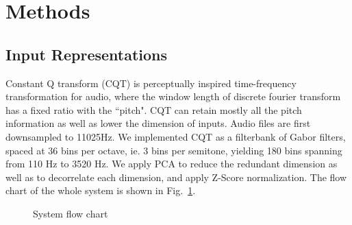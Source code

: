 \documentclass{article}
\begin{document}


\section{Methods}
\subsection{Input Representations}
Constant Q transform (CQT) is perceptually inspired time-frequency transformation for audio, where the window length of discrete fourier transform has a fixed ratio with the ``pitch". CQT can retain mostly all the pitch information as well as lower the dimension of inputs. Audio files are first downsampled to 11025Hz. We implemented CQT as a filterbank of Gabor filters, spaced at 36 bins per octave, ie. 3 bins per semitone, yielding 180 bins spanning from 110 Hz to 3520 Hz. We apply PCA to reduce the redundant dimension as well as to decorrelate each dimension, and apply Z-Score normalization\cite{sola1997importance}. The flow chart of the whole system is shown in Fig.~\ref{fig:flowchart}.

\begin{figure}
 \centerline{}
 \caption{System flow chart}
 \label{fig:flowchart}
\end{figure}
\end{document}
